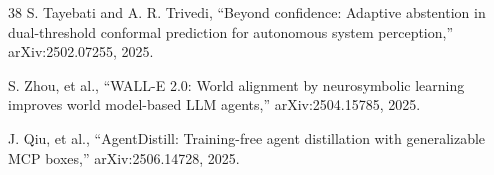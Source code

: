 \documentclass[review]{elsarticle}
\begin{document}
\begin{thebibliography}{38}
 S. Tayebati and A. R. Trivedi, ``Beyond confidence: Adaptive
abstention in dual-threshold conformal prediction for autonomous system
perception,'' arXiv:2502.07255, 2025.

 S. Zhou, et al., ``WALL-E 2.0: World alignment by neurosymbolic
learning improves world model-based LLM agents,'' arXiv:2504.15785, 2025.

 J. Qiu, et al., ``AgentDistill: Training-free agent distillation
with generalizable MCP boxes,'' arXiv:2506.14728, 2025.

\end{thebibliography}
\end{document}
